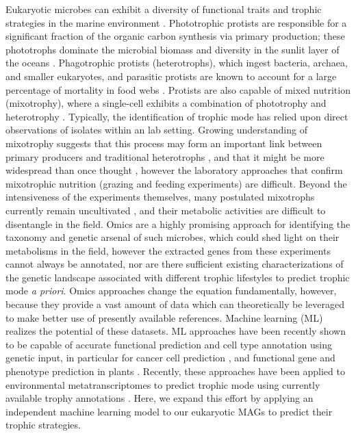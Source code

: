 \documentclass[12pt]{article}
\numberwithin{equation}{section}
\begin{document}
Eukaryotic microbes can exhibit a diversity of functional traits and trophic strategies in the marine environment \citep{Worden2015} \citep{Caron2011Marine}. Phototrophic protists are responsible for a significant fraction of the organic carbon synthesis via primary production; these phototrophs dominate the microbial biomass and diversity in the sunlit layer of the oceans \citep{Worden2015}. Phagotrophic protists (heterotrophs), which ingest bacteria, archaea, and smaller eukaryotes, and parasitic protists are known to account for a large percentage of mortality in food webs \citep{Sherr_2002, Caron2011Marine, Worden2015}. Protists are also capable of mixed nutrition (mixotrophy), where a single-cell exhibits a combination of phototrophy and heterotrophy \citep{Stoecker_2017}. Typically, the identification of trophic mode has relied upon direct observations of isolates within an lab setting. Growing understanding of mixotrophy suggests that this process may form an important link between primary producers and traditional heterotrophs \citep{domaizon2003taxon}, and that it might be more widespread than once thought \citep{Worden2015}, however the laboratory approaches that confirm mixotrophic nutrition (grazing and feeding experiments) are difficult. Beyond the intensiveness of the experiments themselves, many postulated mixotrophs currently remain uncultivated \citep{Worden2015}, and their metabolic activities are difficult to disentangle in the field. Omics are a highly promising approach for identifying the taxonomy and genetic arsenal of such microbes, which could shed light on their metabolisms in the field, however the extracted genes from these experiments cannot always be annotated, nor are there sufficient existing characterizations of the genetic landscape associated with different trophic lifestyles to predict trophic mode \textit{a priori}. Omics approaches change the equation fundamentally, however, because they provide a vast amount of data which can theoretically be leveraged to make better use of presently available references. Machine learning (ML) realizes the potential of these datasets. ML approaches have been recently shown to be capable of accurate functional prediction and cell type annotation using genetic input, in particular for cancer cell prediction \citep{shipp2002diffuse,bashiri2017improving,tabl2019machine}, and functional gene and phenotype prediction in plants \citep{mahood2020machine}. Recently, these approaches have been applied to environmental metatranscriptomes to predict trophic mode using  currently available trophy annotations \citep{lambert2021dynamic}. Here, we expand this effort by applying an independent machine learning model to our eukaryotic MAGs to predict their trophic strategies.
\end{document}
